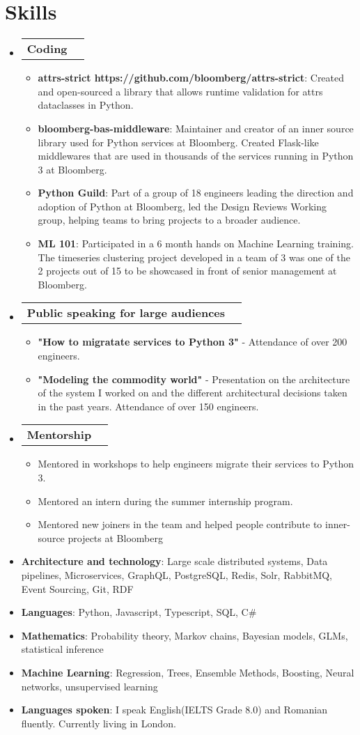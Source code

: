 \documentclass[letterpaper,11pt]{article}
\makeatletter
\newcommand{\resumeItem}[2]{
  \item\small{
    \textbf{#1}{: #2 \vspace{-1pt}}
  }
}
\newcommand{\workItem}[2]{
  \item\small{
    \textbf{#1}{#2 \vspace{-0.6pt}}
  }
}
\newcommand{\resumeCoding}[1]{
  \vspace{-1pt}\item
    \begin{tabular*}{0.97\textwidth}{l@{\extracolsep{\fill}}r}
      \textbf{#1} \\      
    \end{tabular*}\vspace{-5pt}
}
\newcommand{\resumeSubHeadingListStart}{\begin{itemize}[leftmargin=*]}
\newcommand{\resumeSubHeadingListEnd}{\end{itemize}}
\newcommand{\resumeItemListStart}{\begin{itemize}}
\newcommand{\resumeItemListEnd}{\end{itemize}\vspace{-4.6pt}}
\makeatother
\begin{document}
\section{Skills}
 \resumeSubHeadingListStart
    \resumeCoding {Coding}
      \resumeItemListStart
        \resumeItem {attrs-strict https://github.com/bloomberg/attrs-strict}
        {Created and open-sourced a library that allows runtime validation for attrs dataclasses in Python.}
        \resumeItem {bloomberg-bas-middleware}
        {Maintainer and creator of an inner source library used for Python services at Bloomberg. Created Flask-like middlewares that are used in thousands of the services running in Python 3 at Bloomberg.}
        \resumeItem {Python Guild}
        {Part of a group of 18 engineers leading the direction and adoption of Python at Bloomberg, led the Design Reviews Working group, helping teams to bring projects to a broader audience.}
        \resumeItem {ML 101}
        {Participated in a 6 month hands on Machine Learning training. The timeseries clustering project developed in a team of 3 was one of the 2 projects out of 15 to be showcased in front of senior management at Bloomberg.}  
      \resumeItemListEnd
    \resumeCoding {Public speaking for large audiences}
      \resumeItemListStart
        \workItem{}
        {\textbf{"How to migratate services to Python 3"} -  Attendance of over 200 engineers.}
        \workItem{}
        {\textbf{"Modeling the commodity world"} - Presentation on the architecture of the system I worked on and the different architectural decisions taken in the past years. Attendance of over 150 engineers.}
      \resumeItemListEnd
    \resumeCoding {Mentorship}
      \resumeItemListStart
        \workItem{}
        {Mentored in workshops to help engineers migrate their services to Python 3.}
        \workItem{}
        {Mentored an intern during the summer internship program.}
        \workItem{}
        {Mentored new joiners in the team and helped people contribute to inner-source projects at Bloomberg}
      \resumeItemListEnd
   \item{
     \textbf{Architecture and technology}{: Large scale distributed systems, Data pipelines, Microservices, GraphQL, PostgreSQL, Redis, Solr, RabbitMQ, Event Sourcing, Git, RDF}
   }
   \item{
     \textbf{Languages}{: Python, Javascript, Typescript, SQL, C\#}
   }
   \item{
     \textbf{Mathematics}{: Probability theory, Markov chains, Bayesian models, GLMs, statistical inference}
   }
   \item{
     \textbf{Machine Learning}{: Regression, Trees, Ensemble Methods, Boosting, Neural networks, unsupervised learning}
   }
   \item{
     \textbf{Languages spoken}{: I speak English(IELTS Grade 8.0) and Romanian fluently. Currently living in London.}
   }   	
 \resumeSubHeadingListEnd
\end{document}
